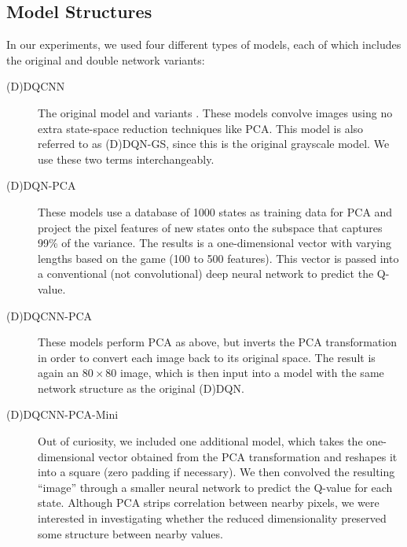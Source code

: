 \documentclass[11pt]{article}
\begin{document}
\subsection{Model Structures}
\label{subsec:model_structure}

In our experiments, we used four different types of models, each of which includes the original and double network variants: 

\begin{description}
    \item[(D)DQCNN] The original model \cite{mnih2013playing, mnih2015human} and variants \cite{van2016deep}. These models convolve images using no extra state-space reduction techniques like PCA. This model is also referred to as (D)DQN-GS, since this is the original grayscale model. We use these two terms interchangeably.
    
    \item[(D)DQN-PCA] These models use a database of 1000 states as training data for PCA and project the pixel features of new states onto the subspace that captures 99\% of the variance. The results is a one-dimensional vector with varying lengths based on the game (100 to 500 features). This vector is passed into a conventional (not convolutional) deep neural network to predict the Q-value.
    
    \item[(D)DQCNN-PCA] These models perform PCA as above, but inverts the PCA transformation in order to convert each image back to its original space. The result is again an $80 \times 80$ image, which is then input into a model with the same network structure as the original (D)DQN.
    
    \item[(D)DQCNN-PCA-Mini] Out of curiosity, we included one additional model, which takes the one-dimensional vector obtained from the PCA transformation and reshapes it into a square (zero padding if necessary). We then convolved the resulting ``image'' through a smaller neural network to predict the Q-value for each state. Although PCA strips correlation between nearby pixels, we were interested in investigating whether the reduced dimensionality preserved some structure between nearby values.
\end{description}
\end{document}
